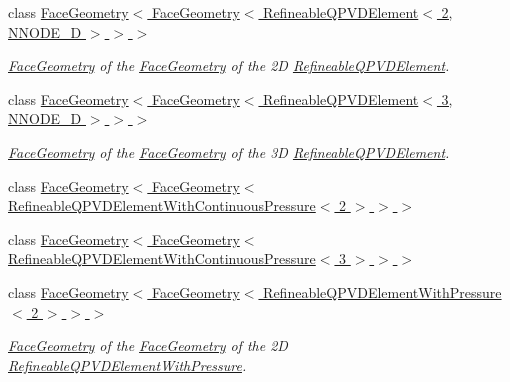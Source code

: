\begin{DoxyCompactItemize}
\item 
class \hyperlink{classoomph_1_1FaceGeometry_3_01FaceGeometry_3_01RefineableQPVDElement_3_012_00_01NNODE__1D_01_4_01_4_01_4}{Face\+Geometry$<$ Face\+Geometry$<$ Refineable\+Q\+P\+V\+D\+Element$<$ 2, N\+N\+O\+D\+E\+\_\+D $>$ $>$ $>$}
\begin{DoxyCompactList}\small\item\em \hyperlink{classoomph_1_1FaceGeometry}{Face\+Geometry} of the \hyperlink{classoomph_1_1FaceGeometry}{Face\+Geometry} of the 2D \hyperlink{classoomph_1_1RefineableQPVDElement}{Refineable\+Q\+P\+V\+D\+Element}. \end{DoxyCompactList}\item 
class \hyperlink{classoomph_1_1FaceGeometry_3_01FaceGeometry_3_01RefineableQPVDElement_3_013_00_01NNODE__1D_01_4_01_4_01_4}{Face\+Geometry$<$ Face\+Geometry$<$ Refineable\+Q\+P\+V\+D\+Element$<$ 3, N\+N\+O\+D\+E\+\_\+D $>$ $>$ $>$}
\begin{DoxyCompactList}\small\item\em \hyperlink{classoomph_1_1FaceGeometry}{Face\+Geometry} of the \hyperlink{classoomph_1_1FaceGeometry}{Face\+Geometry} of the 3D \hyperlink{classoomph_1_1RefineableQPVDElement}{Refineable\+Q\+P\+V\+D\+Element}. \end{DoxyCompactList}\item 
class \hyperlink{classoomph_1_1FaceGeometry_3_01FaceGeometry_3_01RefineableQPVDElementWithContinuousPressure_3_012_01_4_01_4_01_4}{Face\+Geometry$<$ Face\+Geometry$<$ Refineable\+Q\+P\+V\+D\+Element\+With\+Continuous\+Pressure$<$ 2 $>$ $>$ $>$}
\item 
class \hyperlink{classoomph_1_1FaceGeometry_3_01FaceGeometry_3_01RefineableQPVDElementWithContinuousPressure_3_013_01_4_01_4_01_4}{Face\+Geometry$<$ Face\+Geometry$<$ Refineable\+Q\+P\+V\+D\+Element\+With\+Continuous\+Pressure$<$ 3 $>$ $>$ $>$}
\item 
class \hyperlink{classoomph_1_1FaceGeometry_3_01FaceGeometry_3_01RefineableQPVDElementWithPressure_3_012_01_4_01_4_01_4}{Face\+Geometry$<$ Face\+Geometry$<$ Refineable\+Q\+P\+V\+D\+Element\+With\+Pressure$<$ 2 $>$ $>$ $>$}
\begin{DoxyCompactList}\small\item\em \hyperlink{classoomph_1_1FaceGeometry}{Face\+Geometry} of the \hyperlink{classoomph_1_1FaceGeometry}{Face\+Geometry} of the 2D \hyperlink{classoomph_1_1RefineableQPVDElementWithPressure}{Refineable\+Q\+P\+V\+D\+Element\+With\+Pressure}. \end{DoxyCompactList}\item 

\end{DoxyCompactItemize}

